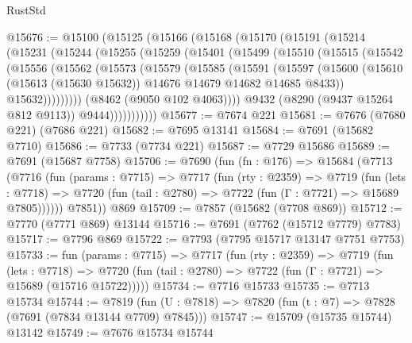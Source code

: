 \begin{lexlean}{RustStd}
\begin{coremodule}
@15676 := @15100
    (@15125
      (@15166
        (@15168
          (@15170
            (@15191
              (@15214
                (@15231
                  (@15244
                    (@15255
                      (@15259
                        (@15401
                          (@15499
                            (@15510
                              (@15515
                                (@15542
                                  (@15556
                                    (@15562
                                      (@15573
                                        (@15579
                                          (@15585
                                            (@15591
                                              (@15597
                                                (@15600
                                                  (@15610
                                                    (@15613 (@15630 @15632))
                                                    @14676
                                                    @14679
                                                    @14682
                                                    @14685
                                                    @8433))
                                                @15632)))))))))
                              (@8462 (@9050 @102 @4063))))
                          @9432
                          (@8290 (@9437 @15264 @812 @9113))
                          @9444)))))))))))
@15677 := @7674 @221
@15681 := @7676 (@7680 @221) (@7686 @221)
@15682 := @7695 @13141
@15684 := @7691 (@15682 @7710)
@15686 := @7733 (@7734 @221)
@15687 := @7729 @15686
@15689 := @7691 (@15687 @7758)
@15706 := @7690
    (fun (fn : @176) =>
    @15684
      (@7713
        (@7716
          (fun (params : @7715) =>
          @7717
            (fun (rty : @2359) =>
            @7719
              (fun (lets : @7718) =>
              @7720 (fun (tail : @2780) => @7722 (fun (Γ : @7721) => @15689 @7805))))))
        @7851))
    @869
@15709 := @7857 (@15682 (@7708 @869))
@15712 := @7770 (@7771 @869) @13144
@15716 := @7691 (@7762 (@15712 @7779) @7783)
@15717 := @7796 @869
@15722 := @7793 (@7795 @15717 @13147 @7751 @7753)
@15733 := fun (params : @7715) =>
  @7717
    (fun (rty : @2359) =>
    @7719
      (fun (lets : @7718) =>
      @7720 (fun (tail : @2780) => @7722 (fun (Γ : @7721) => @15689 (@15716 @15722)))))
@15734 := @7716 @15733
@15735 := @7713 @15734
@15744 := @7819
    (fun (U : @7818) => @7820 (fun (t : @7) => @7828 (@7691 (@7834 @13144 @7709) @7845)))
@15747 := @15709 (@15735 @15744) @13142
@15749 := @7676 @15734 @15744

\end{coremodule}
\end{lexlean}
